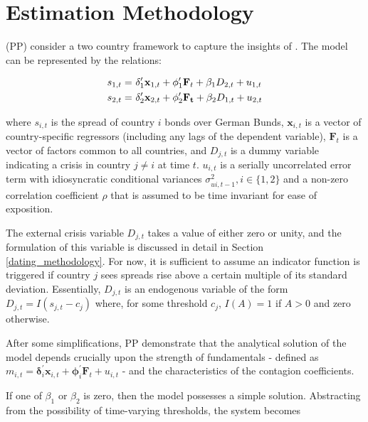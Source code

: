 \documentclass[../base.tex]{subfiles}
\begin{document}
\section{Estimation Methodology}
\label{est}

\cite{pesaran2007econometric} (PP) consider a two country framework to capture the insights of \cite{masson1999contagion}. The model can be represented by the relations:

\begin{align} 
	s_{1,t} =&~\mathbf{\delta}_1^{\prime} \mathbf{x}_{1,t} + \mathbf{\phi}_1^{\prime} \mathbf{F}_t + \beta_1 D_{2,t} + u_{1,t} \label{eqn:system}\\
	s_{2,t} =&~\boldmath{\delta}_2^{\prime} \mathbf{x}_{2,t} + \mathbf{\phi}_2^{\prime} \mathbf{F_t} + \beta_2 D_{1,t} + u_{2,t} \label{eqn:system2}
\end{align}

where $s_{i,t}$ is the spread of country $i$ bonds over German Bunds, $\mathbf{x}_{i,t}$ is a vector of country-specific regressors (including any lags of the dependent variable), $\mathbf{F}_t$ is a vector of factors common to all countries, and $D_{j, t}$ is a dummy variable indicating a crisis in country $j \neq i$ at time $t$. $u_{i, t}$ is a serially uncorrelated error term with idiosyncratic conditional variances $\sigma^2_{ui, t-1}, i \in \{1, 2\}$ and a non-zero correlation coefficient $\rho$ that is assumed to be time invariant for ease of exposition. 

The external crisis variable $D_{j, t}$ takes a value of either zero or unity, and the formulation of this variable is discussed in detail in Section \ref{dating_methodology}. For now, it is sufficient to assume an indicator function is triggered if country $j$ sees spreads rise above a certain multiple of its standard deviation. Essentially, $D_{j,t}$ is an endogenous variable of the form $D_{j, t} = I(s_{j, t} - c_j)$ where, for some threshold $c_j$, $I(A) = 1$ if $A >0$ and zero otherwise.

After some simplifications, PP demonstrate that the analytical solution of the model depends crucially upon the strength of fundamentals - defined as $m_{i,t} = \mathbf{\delta}_i^{\prime} \mathbf{x}_{i,t} + \mathbf{\phi}_i^{\prime} \mathbf{F}_t + u_{i,t}$ - and the characteristics of the contagion coefficients. 

If one of $\beta_1$ or $\beta_2$ is zero, then the model possesses a simple solution. Abstracting from the possibility of time-varying thresholds, the system becomes
\end{document}
